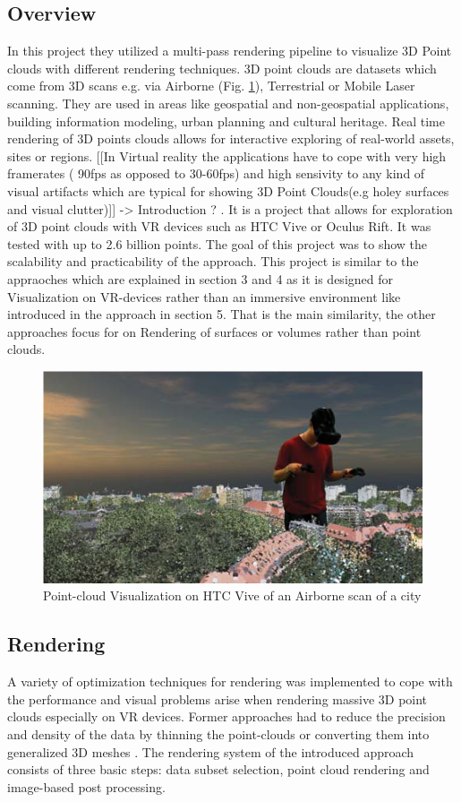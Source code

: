 \documentclass[10pt,twocolumn,letterpaper]{article}
\begin{document}
\subsection{Overview}
In this project \cite{discher_point-based_2018} they utilized a multi-pass rendering pipeline to visualize 3D Point clouds with different rendering techniques. 3D point clouds are datasets which come from 3D scans e.g. via Airborne (Fig. \ref{fig:pointcloud_1}), Terrestrial or Mobile Laser scanning. They are used in areas like geospatial and non-geospatial applications, building information modeling, urban planning and cultural heritage.
Real time rendering of 3D points clouds allows for interactive exploring of real-world assets, sites or regions. 
[[In Virtual reality the applications have to cope with very high framerates ( 90fps as opposed to 30-60fps) and high sensivity to any kind of visual artifacts which are typical for showing 3D Point Clouds(e.g holey surfaces and visual clutter)]]
-> Introduction ?
. It is a project that allows for exploration of 3D point clouds with VR devices such as HTC Vive or Oculus Rift. It was tested with up to 2.6 billion points. The goal of this project was to show the scalability and practicability of the approach.
This project is similar to the appraoches which are explained in section 3 and 4 as it is designed for Visualization on VR-devices rather than an immersive environment like introduced in the approach in section 5. That is the main similarity, the other approaches focus for on Rendering of surfaces or volumes rather than point clouds.
\begin{figure}
	\includegraphics{pointcloud_1.png}
	\caption{Point-cloud Visualization on HTC Vive of an Airborne scan of a city}
	\label{fig:pointcloud_1}
\end{figure}

\subsection{Rendering}
A variety of optimization techniques for rendering was implemented to cope with the performance and visual problems arise when rendering massive 3D point clouds especially on VR devices. Former approaches had to reduce the precision and density of the data by thinning the point-clouds \cite{kreylos2008immersive} or converting them into generalized 3D meshes \cite{berger2017survey}. The rendering system of the introduced approach consists of three basic steps: data subset selection, point cloud rendering and image-based post processing.
\end{document}

